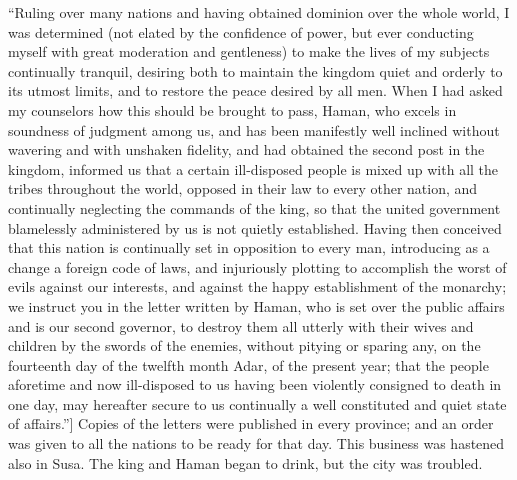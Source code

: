 {\par }{\PP “Ruling over many nations and having obtained dominion over the whole world, I was determined (not elated by the confidence of power, but ever conducting myself with great moderation and gentleness) to make the lives of my subjects continually tranquil, desiring both to maintain the kingdom quiet and orderly to its utmost limits, and to restore the peace desired by all men. When I had asked my counselors how this should be brought to pass, Haman, who excels in soundness of judgment among us, and has been manifestly well inclined without wavering and with unshaken fidelity, and had obtained the second post in the kingdom, informed us that a certain ill-disposed people is mixed up with all the tribes throughout the world, opposed in their law to every other nation, and continually neglecting the commands of the king, so that the united government blamelessly administered by us is not quietly established. Having then conceived that this nation is continually set in opposition to every man, introducing as a change a foreign code of laws, and injuriously plotting to accomplish the worst of evils against our interests, and against the happy establishment of the monarchy; we instruct you in the letter written by Haman, who is set over the public affairs and is our second governor, to destroy them all utterly with their wives and children by the swords of the enemies, without pitying or sparing any, on the fourteenth day of the twelfth month Adar, of the present year; that the people aforetime and now ill-disposed to us having been violently consigned to death in one day, may hereafter secure to us continually a well constituted and quiet state of affairs.”]
Copies of the letters were published in every province; and an order was given to all the nations to be ready for that day.
This business was hastened also in Susa. The king and Haman began to drink, but the city was troubled.

}
